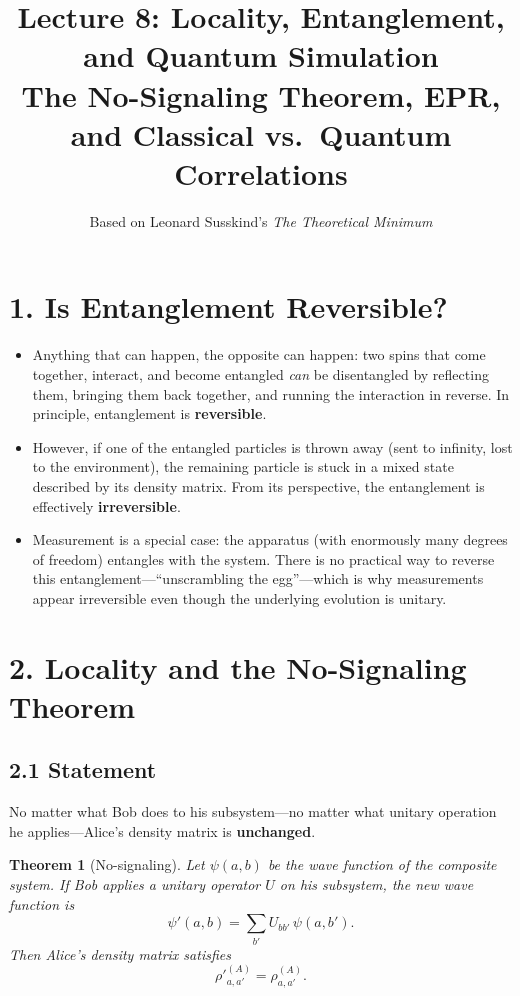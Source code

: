 \documentclass[12pt,a4paper]{article}
\title{\textbf{Lecture 8: Locality, Entanglement, and Quantum Simulation} \\ \large The No-Signaling Theorem, EPR, and Classical vs.\ Quantum Correlations}
\author{Based on Leonard Susskind's \textit{The Theoretical Minimum}}
\date{}
\newtheorem{theorem}{Theorem}
\begin{document}
\maketitle
\thispagestyle{fancy}

\section{1. Is Entanglement Reversible?}

\begin{itemize}[nosep]
    \item Anything that can happen, the opposite can happen: two spins that come together, interact, and become entangled \emph{can} be disentangled by reflecting them, bringing them back together, and running the interaction in reverse.  In principle, entanglement is \textbf{reversible}.
    \item However, if one of the entangled particles is thrown away (sent to infinity, lost to the environment), the remaining particle is stuck in a mixed state described by its density matrix.  From its perspective, the entanglement is effectively \textbf{irreversible}.
    \item Measurement is a special case: the apparatus (with enormously many degrees of freedom) entangles with the system.  There is no practical way to reverse this entanglement---``unscrambling the egg''---which is why measurements appear irreversible even though the underlying evolution is unitary.
\end{itemize}

\section{2. Locality and the No-Signaling Theorem}

\subsection{2.1 Statement}
No matter what Bob does to his subsystem---no matter what unitary operation he applies---Alice's density matrix is \textbf{unchanged}.

\begin{theorem}[No-signaling]
Let $\psi(a,b)$ be the wave function of the composite system.  If Bob applies a unitary operator $U$ on his subsystem, the new wave function is
\[
    \psi'(a,b) = \sum_{b'} U_{bb'}\,\psi(a,b').
\]
Then Alice's density matrix satisfies
\[
    \rho'^{(A)}_{a,a'} = \rho^{(A)}_{a,a'}.
\]
\end{theorem}
\end{document}
